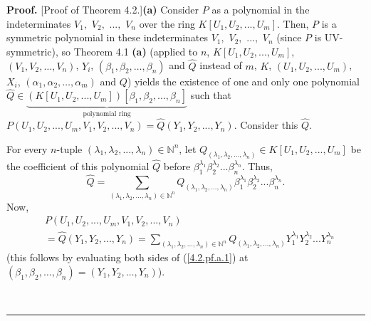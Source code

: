 \documentclass[numbers=enddot,12pt,final,onecolumn,notitlepage]{scrartcl}%
\newenvironment{proof}[1][Proof]{\noindent\textbf{#1.} }{\ \rule{0.5em}{0.5em}}
\begin{document}
\begin{proof}
[Proof of Theorem 4.2.]\textbf{(a)} Consider $P$ as a polynomial in the
indeterminates $V_{1},$ $V_{2},$ $...,$ $V_{n}$ over the ring $K\left[
U_{1},U_{2},...,U_{m}\right]  $. Then, $P$ is a symmetric polynomial in these
indeterminates $V_{1},$ $V_{2},$ $...,$ $V_{n}$ (since $P$ is UV-symmetric),
so Theorem 4.1 \textbf{(a)} (applied to $n$, $K\left[  U_{1},U_{2}%
,...,U_{m}\right]  $, $\left(  V_{1},V_{2},\ldots,V_{n}\right)  $, $Y_{i}$,
$\left(  \beta_{1},\beta_{2},\ldots,\beta_{n}\right)  $ and $\widehat{Q}$
instead of $m$, $K$, $\left(  U_{1},U_{2},...,U_{m}\right)  $, $X_{i}$,
$\left(  \alpha_{1},\alpha_{2},\ldots,\alpha_{m}\right)  $ and $Q$) yields the
existence of one and only one polynomial $\widehat{Q}\in\underbrace{\left(
K\left[  U_{1},U_{2},...,U_{m}\right]  \right)  \left[  \beta_{1},\beta
_{2},...,\beta_{n}\right]  }_{\text{polynomial ring}}$ such that $P\left(
U_{1},U_{2},...,U_{m},V_{1},V_{2},...,V_{n}\right)  =\widehat{Q}\left(
Y_{1},Y_{2},...,Y_{n}\right)  $. Consider this $\widehat{Q}$.

For every $n$-tuple $\left(  \lambda_{1},\lambda_{2},...,\lambda_{n}\right)
\in\mathbb{N}^{n}$, let $Q_{\left(  \lambda_{1},\lambda_{2},...,\lambda
_{n}\right)  }\in K\left[  U_{1},U_{2},...,U_{m}\right]  $ be the coefficient
of this polynomial $\widehat{Q}$ before $\beta_{1}^{\lambda_{1}}\beta
_{2}^{\lambda_{2}}...\beta_{n}^{\lambda_{n}}$. Thus,%
\begin{equation}
\widehat{Q}=\sum_{\left(  \lambda_{1},\lambda_{2},...,\lambda_{n}\right)
\in\mathbb{N}^{n}}Q_{\left(  \lambda_{1},\lambda_{2},\ldots,\lambda
_{n}\right)  }\beta_{1}^{\lambda_{1}}\beta_{2}^{\lambda_{2}}...\beta
_{n}^{\lambda_{n}}. \label{4.2.pf.a.1}%
\end{equation}
Now,%
\begin{align}
&  P\left(  U_{1},U_{2},...,U_{m},V_{1},V_{2},...,V_{n}\right) \nonumber\\
&  =\widehat{Q}\left(  Y_{1},Y_{2},...,Y_{n}\right)  =\sum_{\left(
\lambda_{1},\lambda_{2},...,\lambda_{n}\right)  \in\mathbb{N}^{n}}Q_{\left(
\lambda_{1},\lambda_{2},\ldots,\lambda_{n}\right)  }Y_{1}^{\lambda_{1}}%
Y_{2}^{\lambda_{2}}...Y_{n}^{\lambda_{n}} \label{4.2.pf.a.2}%
\end{align}
(this follows by evaluating both sides of (\ref{4.2.pf.a.1}) at $\left(
\beta_{1},\beta_{2},\ldots,\beta_{n}\right)  =\left(  Y_{1},Y_{2},\ldots
,Y_{n}\right)  $).


\end{proof}
\end{document}
